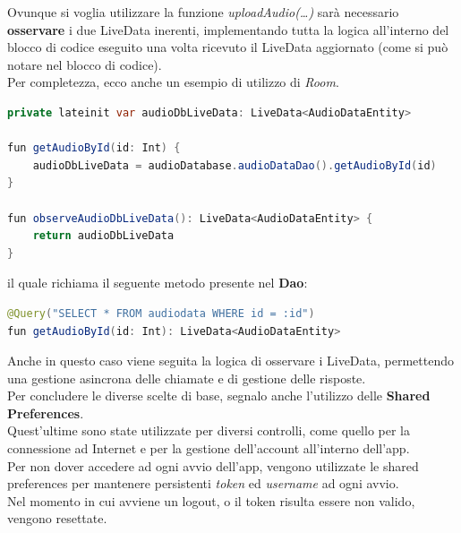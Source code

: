 \documentclass{article}
\begin{document}
Ovunque si voglia utilizzare la funzione \textit{uploadAudio(\dots)} sarà necessario \textbf{osservare} i due LiveData inerenti, implementando tutta la logica all'interno del blocco di codice eseguito una volta ricevuto il LiveData aggiornato (come si può notare nel blocco di codice).\vspace*{14pt}\\
Per completezza, ecco anche un esempio di utilizzo di \textit{Room}.
\begin{lstlisting}[language = JAVA]
private lateinit var audioDbLiveData: LiveData<AudioDataEntity>

fun getAudioById(id: Int) {
    audioDbLiveData = audioDatabase.audioDataDao().getAudioById(id)
}

fun observeAudioDbLiveData(): LiveData<AudioDataEntity> {
    return audioDbLiveData
}
\end{lstlisting}
il quale richiama il seguente metodo presente nel \textbf{Dao}:
\begin{lstlisting}[language = JAVA]
@Query("SELECT * FROM audiodata WHERE id = :id")
fun getAudioById(id: Int): LiveData<AudioDataEntity>
\end{lstlisting}
Anche in questo caso viene seguita la logica di osservare i LiveData, permettendo una gestione asincrona delle chiamate e di gestione delle risposte.\vspace*{14pt}\\
Per concludere le diverse scelte di base, segnalo anche l'utilizzo delle \textbf{Shared Preferences}.\\
Quest'ultime sono state utilizzate per diversi controlli, come quello per la connessione ad Internet e per la gestione dell'account all'interno dell'app.\vspace*{14pt}\\
Per non dover accedere ad ogni avvio dell'app, vengono utilizzate le shared preferences per mantenere persistenti \textit{token} ed \textit{username} ad ogni avvio.\\
Nel momento in cui avviene un logout, o il token risulta essere non valido, vengono resettate.

\pagebreak
\end{document}
